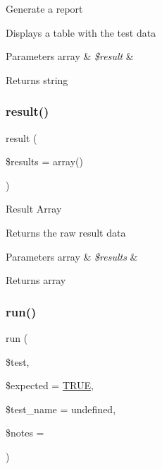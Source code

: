 Generate a report

Displays a table with the test data


\begin{DoxyParams}[1]{Parameters}
array & {\em \$result} & \\
\hline
\end{DoxyParams}
\begin{DoxyReturn}{Returns}
string 
\end{DoxyReturn}
\mbox{\label{class_c_i___unit__test_adcfdd404b2f2610e0690b4beb7786ce5}} 
\subsubsection{\texorpdfstring{result()}{result()}}
{\footnotesize\ttfamily result (\begin{DoxyParamCaption}\item[{}]{\$results = {\ttfamily array()} }\end{DoxyParamCaption})}

Result Array

Returns the raw result data


\begin{DoxyParams}[1]{Parameters}
array & {\em \$results} & \\
\hline
\end{DoxyParams}
\begin{DoxyReturn}{Returns}
array 
\end{DoxyReturn}
\mbox{\label{class_c_i___unit__test_a0bb74f4cb9553ace4034633e69383c55}} 
\subsubsection{\texorpdfstring{run()}{run()}}
{\footnotesize\ttfamily run (\begin{DoxyParamCaption}\item[{}]{\$test,  }\item[{}]{\$expected = {\ttfamily \mbox{\hyperlink{constants_8php_ae04a3efe6aa42044f803ee90c2277846}{T\+R\+UE}}},  }\item[{}]{\$test\+\_\+name = {\ttfamily \textquotesingle{}undefined\textquotesingle{}},  }\item[{}]{\$notes = {\ttfamily \textquotesingle{}\textquotesingle{}} }\end{DoxyParamCaption})}

